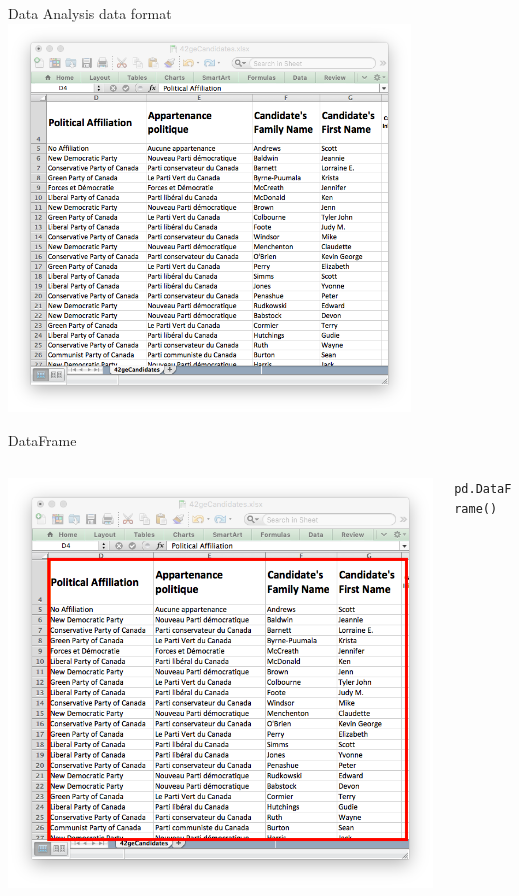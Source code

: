 \documentclass{beamer}
\begin{document}
\begin{frame}{Data Analysis data format}
    \includegraphics[width=0.8\textwidth]{img/data-frame.png}
\end{frame}

\begin{frame}{DataFrame}
    \begin{columns}
        \begin{column}{0.5\textwidth}
            \includegraphics[width=\textwidth]{img/data-frame2.png}
        \end{column}
        \begin{column}{0.5\textwidth}
        \small
        \texttt{pd.DataFrame()}
        \end{column}
    \end{columns}
\end{frame}
\end{document}
